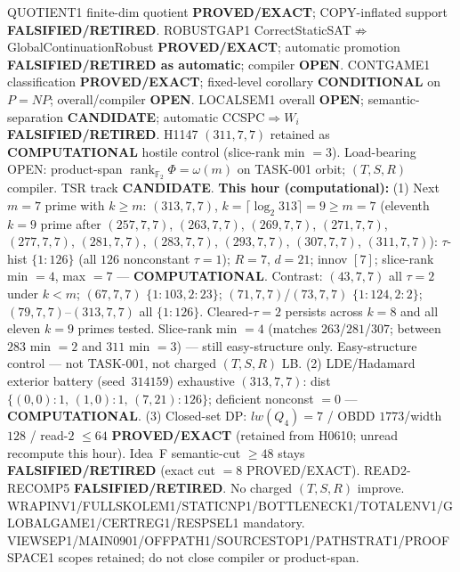 \documentclass[11pt]{article}
\begin{document}
QUOTIENT1 finite-dim quotient \textbf{PROVED/EXACT}; COPY-inflated support \textbf{FALSIFIED/RETIRED}.
ROBUSTGAP1 CorrectStaticSAT$\not\Rightarrow$GlobalContinuationRobust \textbf{PROVED/EXACT};
automatic promotion \textbf{FALSIFIED/RETIRED as automatic}; compiler \textbf{OPEN}.
CONTGAME1 classification \textbf{PROVED/EXACT}; fixed-level corollary \textbf{CONDITIONAL} on $P=NP$;
overall/compiler \textbf{OPEN}.
LOCALSEM1 overall \textbf{OPEN}; semantic-separation \textbf{CANDIDATE}; automatic CCSPC$\Rightarrow W_i$
\textbf{FALSIFIED/RETIRED}.
H1147 $(311,7,7)$ retained as \textbf{COMPUTATIONAL} hostile control (slice-rank min $=3$).
Load-bearing OPEN: product-span $\operatorname{rank}_{\mathbb F_2}\Phi=\omega(m)$ on TASK-001 orbit;
$(T,S,R)$ compiler. TSR track \textbf{CANDIDATE}.
\textbf{This hour (computational):}
(1) Next $m{=}7$ prime with $k{\ge}m$: $(313,7,7)$, $k{=}\lceil\log_2 313\rceil=9{\ge}m{=}7$
(eleventh $k{=}9$ prime after $(257,7,7)$, $(263,7,7)$, $(269,7,7)$, $(271,7,7)$, $(277,7,7)$, $(281,7,7)$, $(283,7,7)$, $(293,7,7)$, $(307,7,7)$, $(311,7,7)$):
$\tau$-hist $\{1{:}126\}$ (all $126$ nonconstant $\tau{=}1$); $R{=}7$, $d{=}21$; innov $[7]$;
slice-rank min $=4$, max $=7$ --- \textbf{COMPUTATIONAL}.
Contrast: $(43,7,7)$ all $\tau{=}2$ under $k{<}m$; $(67,7,7)$ $\{1{:}103,2{:}23\}$;
$(71,7,7)$/$(73,7,7)$ $\{1{:}124,2{:}2\}$; $(79,7,7)$--$(313,7,7)$ all $\{1{:}126\}$.
Cleared-$\tau{=}2$ persists across $k{=}8$ and all eleven $k{=}9$ primes tested.
Slice-rank min $=4$ (matches $263$/$281$/$307$; between $283$ min $=2$ and $311$ min $=3$) --- still easy-structure only.
Easy-structure control --- not TASK-001, not charged $(T,S,R)$ LB.
(2) LDE/Hadamard exterior battery (seed~$314159$) exhaustive $(313,7,7)$:
dist $\{(0,0){:}1,\,(1,0){:}1,\,(7,21){:}126\}$; deficient nonconst $=0$ --- \textbf{COMPUTATIONAL}.
(3) Closed-set DP: $lw(Q_4)=7$ / OBDD $1773$/width $128$ / read-$2$ $\le64$
\textbf{PROVED/EXACT} (retained from H0610; unread recompute this hour).
Idea~F semantic-cut $\ge48$ stays \textbf{FALSIFIED/RETIRED} (exact cut $=8$ PROVED/EXACT).
READ2-RECOMP5 \textbf{FALSIFIED/RETIRED}. No charged $(T,S,R)$ improve.
WRAPINV1/FULLSKOLEM1/STATICNP1/BOTTLENECK1/TOTALENV1/GLOBALGAME1/CERTREG1/RESPSEL1 mandatory.
VIEWSEP1/MAIN0901/OFFPATH1/SOURCESTOP1/PATHSTRAT1/PROOFSPACE1 scopes retained; do not close compiler or product-span.
\end{document}
